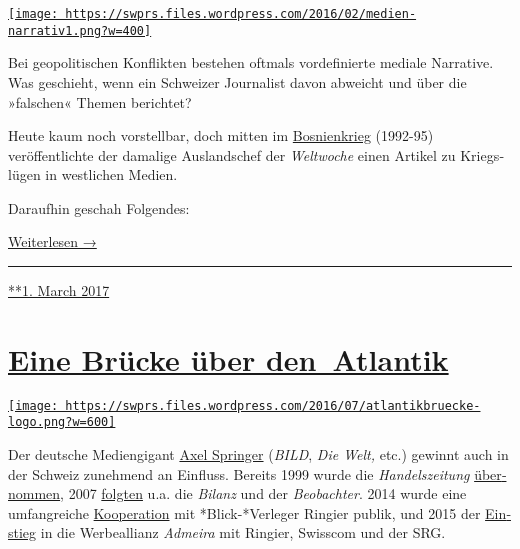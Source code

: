 \href{https://swprs.org/2017/03/01/das-gewuenschte-narrativ/}{\texttt{[image: https://swprs.files.wordpress.com/2016/02/medien-narrativ1.png?w=400]}}

Bei geopolitischen Konflikten bestehen oftmals vordefinierte mediale
Narrative. Was geschieht, wenn ein Schweizer Jour­na­list davon abweicht
und über die »falschen« Themen be­richtet?

Heute kaum noch vorstellbar, doch mitten im
\href{https://de.wikipedia.org/wiki/Bosnienkrieg}{Bosnien­krieg}
(1992-95) veröffentlichte der damalige Aus­lands­chef der
\emph{Welt­woche} einen Artikel zu Kriegs­lügen in west­lichen Medien.

Daraufhin geschah Folgendes:

\href{https://swprs.org/das-gewuenschte-narrativ\#weiterlesen}{Weiterlesen
→}

\begin{center}\rule{0.5\linewidth}{\linethickness}\end{center}

\href{https://swprs.org/2017/03/01/das-gewuenschte-narrativ/}{**1. March
2017}

\hypertarget{eine-bruxfccke-uxfcber-den-atlantik}{%
\section{\texorpdfstring{\href{https://swprs.org/2017/03/01/eine-bruecke-ueber-den-atlantik/}{Eine
Brücke über
den~Atlantik}}{Eine Brücke über den~Atlantik}}\label{eine-bruxfccke-uxfcber-den-atlantik}}

\href{https://swprs.org/2017/03/01/eine-bruecke-ueber-den-atlantik/}{\texttt{[image: https://swprs.files.wordpress.com/2016/07/atlantikbruecke-logo.png?w=600]}}

Der deutsche Medien­gigant
\href{https://de.wikipedia.org/wiki/Axel_Springer_SE}{Axel Springer}
(\emph{BILD}, \emph{Die Welt,} etc.) gewinnt auch in der Schweiz
zu­neh­mend an Einfluss. Bereits 1999 wurde die \emph{Handels­zeitung}
\href{https://de.wikipedia.org/wiki/Handelszeitung}{über­nommen}, 2007
\href{https://de.wikipedia.org/wiki/Jean_Frey_AG}{folgten} u.a. die
\emph{Bilanz} und der \emph{Beobachter}. 2014 wurde eine umfang­reiche
\href{http://www.blick.ch/news/wirtschaft/medien-ringier-und-axel-springer-gruenden-gemeinschaftsunternehmen-in-der-schweiz-id3357037.html}{Koope­ration}
mit *Blick-*Verleger Ringier publik, und 2015 der
\href{http://www.persoenlich.com/marketing/die-werbeallianz-prasentiert-sich-zum-ersten-mal-der-branche}{Ein­stieg}
in die Werbe­allianz \emph{Admeira} mit Ringier, Swiss­com und der SRG.

